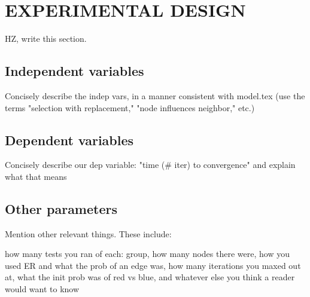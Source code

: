 
\section{EXPERIMENTAL DESIGN}

HZ, write this section.

\subsection{Independent variables}

Concisely describe the indep vars, in a manner consistent with model.tex (use
the terms "selection with replacement," "node influences neighbor," etc.)


\subsection{Dependent variables}

Concisely describe our dep variable: "time (# iter) to convergence" and
explain what that means

\subsection{Other parameters}

Mention other relevant things. These include:

how many tests you ran of each: 
group, how many nodes there were, how you used ER and what the prob of an edge
was, how many iterations you maxed out at, what the init prob was of red vs
blue, and whatever else you think a reader would want to know
